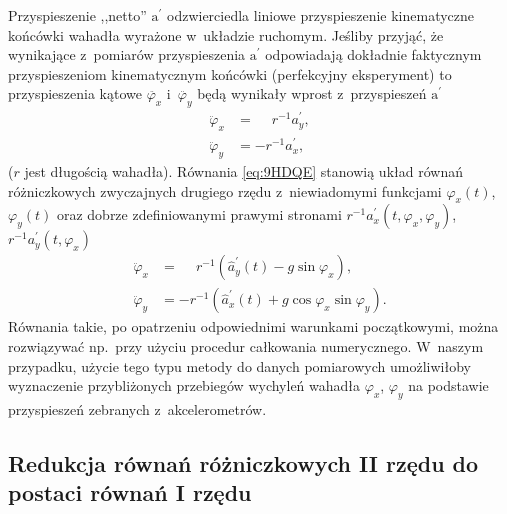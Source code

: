 \documentclass[paper=a4,DIV=12]{tmmlab}
\newcommand{\brm}[1]{\bm{\mathrm{#1}}}
\begin{document}
\begin{appendices}
Przyspieszenie ,,netto'' $\brm{a}^{\prime}$ odzwierciedla liniowe
przyspieszenie kinematyczne końcówki wahadła wyrażone w~układzie ruchomym.
Jeśliby przyjąć, że wynikające z~pomiarów przyspieszenia $\brm{a}^{\prime}$
odpowiadają dokładnie faktycznym przyspieszeniom kinematycznym końcówki
(perfekcyjny eksperyment) to przyspieszenia kątowe $\ddot{\varphi_x}$
i~$\ddot{\varphi_y}$ będą wynikały wprost z~przyspieszeń $\brm{a}^{\prime}$
\begin{subequations}
  \label{eq:9HDQE}
  \begin{align}
    \ddot{\varphi}_x &=\phantom{-}r^{-1} a_y^{\prime},
    \label{eq:UIQUR}
    \\
    \ddot{\varphi}_y &=         - r^{-1} a_x^{\prime},
    \label{eq:ZBLRS}
  \end{align}
\end{subequations}
($r$ jest długością wahadła). Równania \eqref{eq:9HDQE} stanowią
układ równań różniczkowych zwyczajnych drugiego rzędu z~niewiadomymi funkcjami
$\varphi_x(t)$, $\varphi_y(t)$ oraz dobrze zdefiniowanymi prawymi stronami
$r^{-1}a_x^{\prime}(t,\varphi_x,\varphi_y)$, $r^{-1}a_y^{\prime}(t,\varphi_x)$
\begin{subequations}
  \label{eq:ROGUO}
  \begin{align}
    \ddot{\varphi}_x & = \phantom{-} r^{-1} \left(
      \hat{a}_y^{\prime}\left(t\right) - g \sin{\varphi_x}
    \right),
    \label{eq:HRYMM}
    \\
    \ddot{\varphi}_y & = - r^{-1} \left(
        \hat{a}_x^{\prime}\left(t\right) + g \cos{\varphi_x} \sin{\varphi_y}
    \right).
    \label{eq:D4N2B}
  \end{align}
\end{subequations}
Równania takie, po opatrzeniu odpowiednimi warunkami początkowymi, można
rozwiązywać np.~przy użyciu procedur całkowania numerycznego. W~naszym
przypadku, użycie tego typu metody do danych pomiarowych umożliwiłoby
wyznaczenie przybliżonych przebiegów wychyleń wahadła $\varphi_x$, $\varphi_y$
na podstawie przyspieszeń zebranych z~akcelerometrów.

\subsection{Redukcja równań różniczkowych II rzędu do postaci równań I rzędu}
\label{sec:WKKBB}


\end{appendices}
\end{document}
